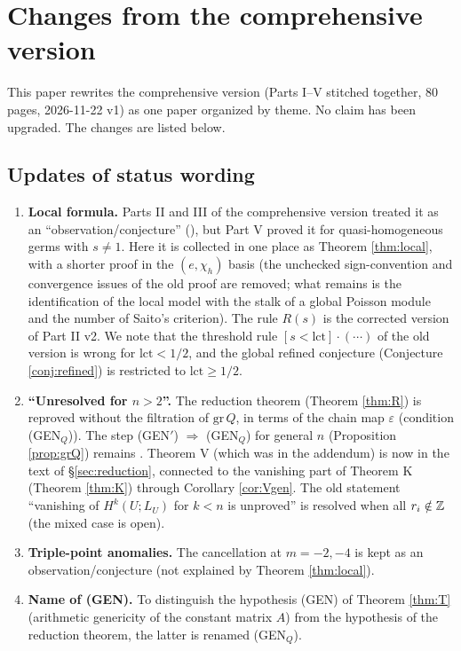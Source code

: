 \appendix
\section{Changes from the comprehensive version}\label{app:changes}
This paper rewrites the comprehensive version (Parts I--V stitched together, 80 pages, 2026-11-22 v1) as one paper organized by theme. No claim has been upgraded. The changes are listed below.

\subsection{Updates of status wording}
\begin{enumerate}
\item \textbf{Local formula.} Parts II and III of the comprehensive version treated it as an ``observation/conjecture'' (\tP \tV \tK), but Part V proved it for quasi-homogeneous germs with $s\ne1$. Here it is collected in one place as Theorem \ref{thm:local}, with a shorter proof in the $(e,\chi_h)$ basis (the unchecked sign-convention and convergence issues of the old proof are removed; what remains \tQ is the identification of the local model with the stalk of a global Poisson module and the number of Saito's criterion). The rule $R(s)$ is the corrected version of Part II v2. We note that the threshold rule $[s<\mathrm{lct}]\cdot(\cdots)$ of the old version is wrong for $\mathrm{lct}<1/2$, and the global refined conjecture (Conjecture \ref{conj:refined}) is restricted to $\mathrm{lct}\ge1/2$.
\item \textbf{``Unresolved for $n>2$''.} The reduction theorem (Theorem \ref{thm:R}) is reproved without the filtration of $\mathrm{gr}\,Q$, in terms of the chain map $\varepsilon$ (condition (GEN$_Q$)). The step (GEN$'$) $\Rightarrow$ (GEN$_Q$) for general $n$ (Proposition \ref{prop:grQ}) remains \tQ. Theorem V (which was in the addendum) is now in the text of \S\ref{sec:reduction}, connected to the vanishing part of Theorem K (Theorem \ref{thm:K}) through Corollary \ref{cor:Vgen}. The old statement ``vanishing of $H^k(U;L_U)$ for $k<n$ is unproved'' is resolved when all $r_i\notin\mathbb Z$ (the mixed case is open).
\item \textbf{Triple-point anomalies.} The cancellation at $m=-2,-4$ is kept as an observation/conjecture (not explained by Theorem \ref{thm:local}).
\item \textbf{Name of (GEN).} To distinguish the hypothesis (GEN) of Theorem \ref{thm:T} (arithmetic genericity of the constant matrix $A$) from the hypothesis of the reduction theorem, the latter is renamed (GEN$_Q$).
\end{enumerate}


